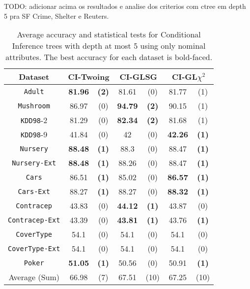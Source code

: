 TODO: adicionar acima os resultados e analise dos criterios com ctree em depth 5 pra SF Crime, Shelter e Reuters.


\begin{table*}
\small
\centering
    \caption{Average accuracy and statistical tests  for  Conditional Inference trees 
with depth at most 5 using only nominal attributes. The best accuracy for each dataset is bold-faced.}
\label{tab:CrossValCTree}
\begin{tabular}{c|cc|cc|cc} 
Dataset &   \multicolumn{2}{c|}{CI-Twoing} &   \multicolumn{2}{c|}{CI-GLSG} & \multicolumn{2}{c}{CI-GL$\chi^2$} \\  \hline   
{\tt Adult}         &{\bf 81.96} &{\bf  (2)} & 81.61 & (0) & 81.77 & (1) \\
{\tt Mushroom}         &86.97 & (0) &{\bf  94.79 }& {\bf (2)} & 90.15 & (1) \\
{\tt KDD98}-2         &81.29 & (0) & {\bf 82.34 }& {\bf (2) }& 81.68 & (1) \\
{\tt KDD98}-9         &41.84 & (0) & 42    & (0) & {\bf 42.26} & {\bf (1)} \\
{\tt Nursery}         &{\bf 88.48} & {\bf (1)} & 88.3  & (0) & 88.47 & {\bf (1)} \\
{\tt Nursery-Ext}         &{\bf 88.48} & {\bf (1)} & 88.26 & (0) & 88.47 & {\bf (1)} \\
{\tt Cars}         &86.51 & {\bf (1)} & 85.02 & (0) & {\bf 86.57} & {\bf (1)} \\
{\tt Cars-Ext}         &88.27 & {\bf (1) }& 88.27& (0) & {\bf 88.32} & {\bf (1)} \\
{\tt Contracep}         &43.83 & (0) & {\bf 44.12} & {\bf (1)} & 43.87 & (0) \\
{\tt Contracep-Ext}         &43.39 & (0) & {\bf 43.81} & {\bf (1)} & 43.76 & {\bf (1)} \\
{\tt CoverType}         &54.1  & (0) & 54.1  & (0) & 54.1  & (0) \\
{\tt CoverType-Ext}         &54.1  & (0) & 54.1  & (0) & 54.1  & (0) \\
{\tt Poker}         &{\bf 51.05} & {\bf (1)} & 50.56 & (0) & 50.91 & {\bf (1)} \\  \hline
Average (Sum)         &66.98 & (7)  &  67.51 & (10)  & 67.25 &  (10)
       \end{tabular}
\end{table*}


